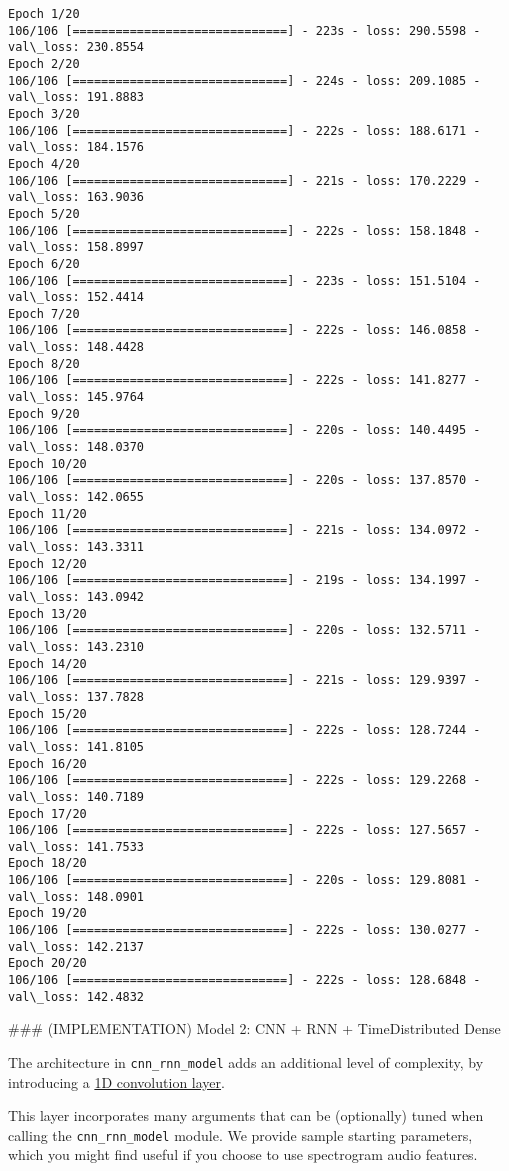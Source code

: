 \documentclass[11pt]{article}
\begin{document}
    \begin{Verbatim}[commandchars=\\\{\}]
Epoch 1/20
106/106 [==============================] - 223s - loss: 290.5598 - val\_loss: 230.8554
Epoch 2/20
106/106 [==============================] - 224s - loss: 209.1085 - val\_loss: 191.8883
Epoch 3/20
106/106 [==============================] - 222s - loss: 188.6171 - val\_loss: 184.1576
Epoch 4/20
106/106 [==============================] - 221s - loss: 170.2229 - val\_loss: 163.9036
Epoch 5/20
106/106 [==============================] - 222s - loss: 158.1848 - val\_loss: 158.8997
Epoch 6/20
106/106 [==============================] - 223s - loss: 151.5104 - val\_loss: 152.4414
Epoch 7/20
106/106 [==============================] - 222s - loss: 146.0858 - val\_loss: 148.4428
Epoch 8/20
106/106 [==============================] - 222s - loss: 141.8277 - val\_loss: 145.9764
Epoch 9/20
106/106 [==============================] - 220s - loss: 140.4495 - val\_loss: 148.0370
Epoch 10/20
106/106 [==============================] - 220s - loss: 137.8570 - val\_loss: 142.0655
Epoch 11/20
106/106 [==============================] - 221s - loss: 134.0972 - val\_loss: 143.3311
Epoch 12/20
106/106 [==============================] - 219s - loss: 134.1997 - val\_loss: 143.0942
Epoch 13/20
106/106 [==============================] - 220s - loss: 132.5711 - val\_loss: 143.2310
Epoch 14/20
106/106 [==============================] - 221s - loss: 129.9397 - val\_loss: 137.7828
Epoch 15/20
106/106 [==============================] - 222s - loss: 128.7244 - val\_loss: 141.8105
Epoch 16/20
106/106 [==============================] - 222s - loss: 129.2268 - val\_loss: 140.7189
Epoch 17/20
106/106 [==============================] - 222s - loss: 127.5657 - val\_loss: 141.7533
Epoch 18/20
106/106 [==============================] - 220s - loss: 129.8081 - val\_loss: 148.0901
Epoch 19/20
106/106 [==============================] - 222s - loss: 130.0277 - val\_loss: 142.2137
Epoch 20/20
106/106 [==============================] - 222s - loss: 128.6848 - val\_loss: 142.4832

    \end{Verbatim}

     \#\#\# (IMPLEMENTATION) Model 2: CNN + RNN + TimeDistributed Dense

The architecture in \texttt{cnn\_rnn\_model} adds an additional level of
complexity, by introducing a
\href{https://keras.io/layers/convolutional/\#conv1d}{1D convolution
layer}.

This layer incorporates many arguments that can be (optionally) tuned
when calling the \texttt{cnn\_rnn\_model} module. We provide sample
starting parameters, which you might find useful if you choose to use
spectrogram audio features.
\end{document}
